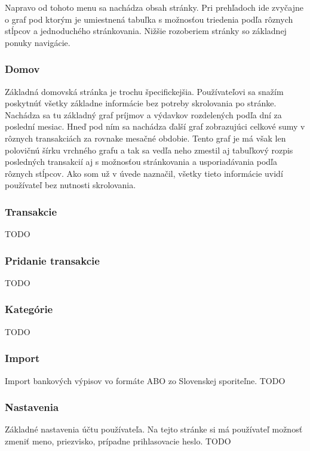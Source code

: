 \documentclass[12pt,onesided]{book}
\begin{document}
Napravo od tohoto menu sa nachádza obsah stránky. Pri prehľadoch ide zvyčajne o graf pod ktorým je umiestnená tabuľka s možnosťou triedenia podľa rôznych stĺpcov a jednoduchého stránkovania. Nižšie rozoberiem stránky so základnej ponuky navigácie. 

\subsubsection{Domov}
Základná domovská stránka je trochu špecifickejšia. Používateľovi sa snažím poskytnúť všetky základne informácie bez potreby skrolovania po stránke. Nachádza sa tu základný graf príjmov a výdavkov rozdelených podľa dní za poslední mesiac. Hneď pod ním sa nachádza ďalší graf zobrazujúci celkové sumy v rôznych transakciách za rovnake mesačné obdobie. Tento graf je má však len polovičnú šírku vrchného grafu a tak sa vedľa neho zmestil aj tabuľkový rozpis posledných transakcií aj s možnosťou stránkovania a usporiadávania podľa rôznych stĺpcov. Ako som už v úvede naznačil, všetky tieto informácie uvidí používateľ bez nutnosti skrolovania.

\subsubsection{Transakcie}

TODO

\subsubsection{Pridanie transakcie}

TODO

\subsubsection{Kategórie}

TODO

\subsubsection{Import}

Import bankových výpisov vo formáte ABO zo Slovenskej sporiteľne. TODO

\subsubsection{Nastavenia}

Základné nastavenia účtu používateľa. Na tejto stránke si má používateľ možnosť zmeniť meno, priezvisko, prípadne prihlasovacie heslo. TODO
\end{document}
